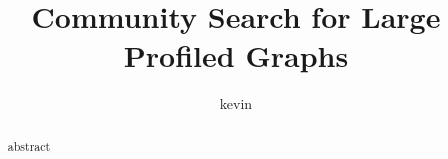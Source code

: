 \documentclass{vldb}
\begin{document}
\title{Community Search for Large Profiled Graphs}
\author{kevin}

\maketitle
\begin{abstract}
abstract
\end{abstract}




\clearpage

\vspace{0.99em}
\small{}
\end{document}
